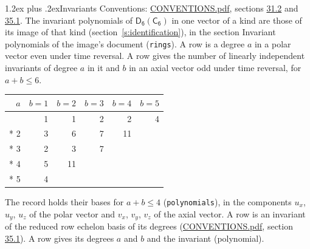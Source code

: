 \documentclass[10pt,a4paper]{article}
\makeatletter
\renewcommand\section{\@startsection{section}{1}{\z@}{-3ex plus -1ex minus -.2ex}%
  {1.2ex plus .2ex}{\normalfont\large\sffamily\bfseries\color{parttitle}}}
\numberwithin{equation}{section}
\newcommand{\grp}[1]{\mathsf{#1}}
\makeatother
\begin{document}
\section{Invariants}\label{s:invariants}
Conventions: \href{../../CONVENTIONS.pdf}{CONVENTIONS.pdf}, sections \href{../../CONVENTIONS.pdf\#conv.31.2}{31.2} and \href{../../CONVENTIONS.pdf\#conv.35.1}{35.1}.
The invariant polynomials of $\grp{D_{6}}(\grp{C_{6}})$ in one vector of a kind are those of its image of that kind (section~\ref{s:identification}), in the section Invariant polynomials of the image's document (\texttt{rings}).
\leavevmode\label{n:index.degree.polar}\label{n:index.degree.axial}A row is a degree $a$ in a polar vector even under time reversal. A row gives the number of linearly independent invariants of degree $a$ in it and $b$ in an axial vector odd under time reversal, for $a + b \le 6$.
{\small\begin{longtable}{@{}rrrrrr@{}}\toprule
$a$ & $b = 1$ & $b = 2$ & $b = 3$ & $b = 4$ & $b = 5$\\\midrule\endhead
\bottomrule\endfoot\endlastfoot
1 & 1 & 1 & 2 & 2 & 4\\*
2 & 3 & 6 & 7 & 11 & \\*
3 & 2 & 3 & 7 &  & \\*
4 & 5 & 11 &  &  & \\*
5 & 4 &  &  &  & \\
\bottomrule\end{longtable}}
\leavevmode\label{n:local.component.polar}\label{n:local.component.axial}The record holds their bases for $a + b \le 4$ (\texttt{polynomials}), in the components $u_{x}$, $u_{y}$, $u_{z}$ of the polar vector and $v_{x}$, $v_{y}$, $v_{z}$ of the axial vector. \label{n:head.polynomial}A row is an invariant of the reduced row echelon basis of its degrees (\href{../../CONVENTIONS.pdf}{CONVENTIONS.pdf}, section \href{../../CONVENTIONS.pdf\#conv.35.1}{35.1}). A row gives its degrees $a$ and $b$ and the invariant (polynomial).
\end{document}
